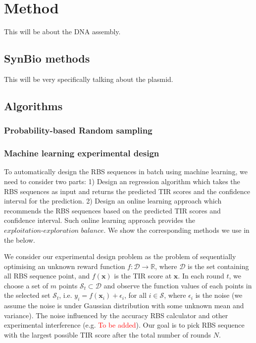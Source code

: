 \section{Method}
This will be about the DNA assembly.\\
\subsection{SynBio methods}
This will be very specifically talking about the plasmid.

\subsection{Algorithms}

\subsubsection{Probability-based Random sampling}

\subsubsection{Machine learning experimental design}

To automatically design the RBS sequences in batch using machine learning, we need to consider two parts: 
1) Design an regression algorithm which takes the RBS sequences as input and returns the predicted TIR scores and the confidence interval for the prediction. 
2) Design an online learning approach which recommends the RBS sequences based on the predicted TIR scores and confidence interval. 
Such online learning approach provides the $\textit{exploitation-exploration balance}$. 
We show the corresponding methods we use in the below. 

We consider our experimental design problem as the problem of sequentially optimising an unknown reward function $f: \mathcal{D} \rightarrow \mathbb{R}$, where $\mathcal{D}$ is the set containing all RBS sequence point, and $f(\mathbf{x})$ is the TIR score at $\mathbf{x}$. 
In each round $t$, we choose a set of $m$ points $\mathcal{S}_t \subset \mathcal{D}$ and observe the function values of each points in the selected set $\mathcal{S}_t$, i.e. $y_i = f(\mathbf{x}_i) + \epsilon_i$, for all $i \in \mathcal{S}$, where $\epsilon_i$ is the noise (we assume the noise is under Gaussian distribution with some unknown mean and variance). 
The noise influenced by the accuracy RBS calculator and other experimental interference (e.g. \textcolor{red}{To be added}). 
Our goal is to pick RBS sequence with the largest possible TIR score after the total number of rounds $N$. 

